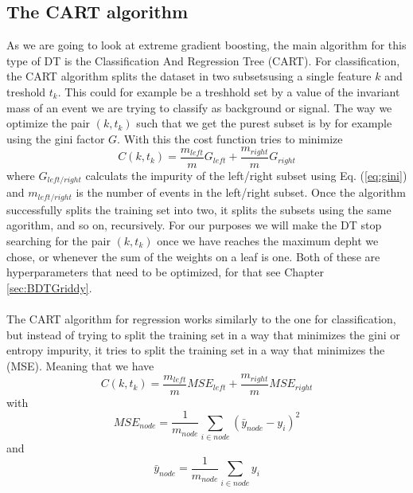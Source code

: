 \documentclass[12pt, a4paper]{book}
\begin{document}
\subsection{The CART algorithm} 
As we are going to look at extreme gradient boosting, the main algorithm for this type of DT is the Classification And Regression Tree (CART). For classification, the CART algorithm splits the dataset in two subsetsusing a single feature $k$ and treshold $t_k$. This could for example be 
a treshhold set by a value of the invariant mass of an event we are trying to classify as background or signal. The way we optimize the pair $(k,t_k)$ such that we get the purest subset is by for example using the gini factor $G$. With this the cost function tries to minimize
$$
C(k,t_k)=\frac{m_{left}}{m}G_{left}+\frac{m_{right}}{m}G_{right}
$$
where $G_{left/right}$ calculats the impurity of the left/right subset using Eq. (\ref{eq:gini}) and $m_{left/right}$ is the number of events in the left/right subset. Once the algorithm successfully splits the training set into two, it splits the subsets using the same agorithm, and so on, 
recursively. For our purposes we will make the DT stop searching for the pair $(k,t_k)$ once we have reaches the maximum depht we chose, or whenever the sum of the weights on a leaf is one. Both of these are hyperparameters that need to be optimized, for that see Chapter \ref{sec:BDTGriddy}.\\
\\The CART algorithm for regression works similarly to the one for classification, but instead of trying to split the training set in a way that minimizes the gini or entropy impurity, it tries to split the training set in a way that minimizes the (MSE). Meaning that we have
$$
C(k,t_k)=\frac{m_{left}}{m}MSE_{left}+\frac{m_{right}}{m}MSE_{right}
$$
with
$$
MSE_{node} = \frac{1}{m_{node}}\sum_{i\in node}(\bar{y}_{node} -y_i)^2
$$
and
$$
\bar{y}_{node} = \frac{1}{m_{node}}\sum_{i\in node}y_i
$$
\end{document}

